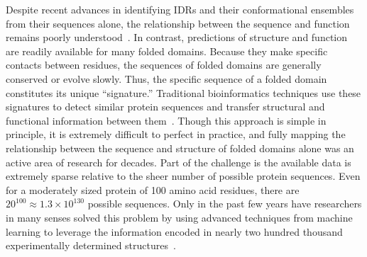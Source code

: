 Despite recent advances in identifying IDRs and their conformational ensembles from their sequences alone, the relationship between the sequence and function remains poorly understood~\cite{Mao2010, vanderLee2014, Das2015, Necci2021}. In contrast, predictions of structure and function are readily available for many folded domains. Because they make specific contacts between residues, the sequences of folded domains are generally conserved or evolve slowly. Thus, the specific sequence of a folded domain constitutes its unique ``signature.'' Traditional bioinformatics techniques use these signatures to detect similar protein sequences and transfer structural and functional information between them~\cite{Camacho2009, Eddy2009, Mistry2020}. Though this approach is simple in principle, it is extremely difficult to perfect in practice, and fully mapping the relationship between the sequence and structure of folded domains alone was an active area of research for decades. Part of the challenge is the available data is extremely sparse relative to the sheer number of possible protein sequences. Even for a moderately sized protein of 100 amino acid residues, there are $20^{100} \approx 1.3 \times 10^{130}$ possible sequences. Only in the past few years have researchers in many senses solved this problem by using advanced techniques from machine learning to leverage the information encoded in nearly two hundred thousand experimentally determined structures~\cite{Jumper2021}.

